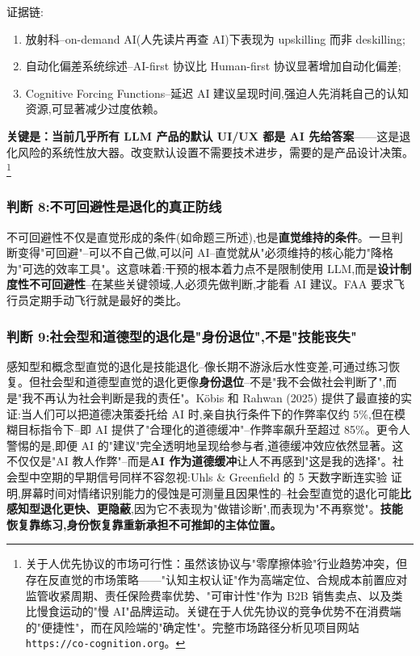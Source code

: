 \documentclass[11pt,a4paper]{article}
\begin{document}
证据链:
\begin{enumerate}[label=(\alph*)]
  \item 放射科--on-demand AI(人先读片再查 AI)下表现为 upskilling 而非 deskilling\cite{oncology2024};
  \item 自动化偏差系统综述--AI-first 协议比 Human-first 协议显著增加自动化偏差\cite{automationbias};
  \item Cognitive Forcing Functions--延迟 AI 建议呈现时间,强迫人先消耗自己的认知资源,可显著减少过度依赖\cite{bucinca2021cognitive}。
\end{enumerate}

\textbf{关键是：当前几乎所有 LLM 产品的默认 UI/UX 都是 AI 先给答案}——这是退化风险的系统性放大器。改变默认设置不需要技术进步，需要的是产品设计决策。\footnote{关于人优先协议的市场可行性：虽然该协议与"零摩擦体验"行业趋势冲突，但存在反直觉的市场策略——"认知主权认证"作为高端定位、合规成本前置应对监管收紧周期、责任保险费率优势、"可审计性"作为 B2B 销售卖点、以及类比慢食运动的"慢 AI"品牌运动。关键在于人优先协议的竞争优势不在消费端的"便捷性"，而在风险端的"确定性"。完整市场路径分析见项目网站 \texttt{https://co-cognition.org}。}

\subsubsection{判断 8:不可回避性是退化的真正防线}

不可回避性不仅是直觉形成的条件(如命题三所述),也是\textbf{直觉维持的条件}。一旦判断变得"可回避"--可以不自己做,可以问 AI--直觉就从"必须维持的核心能力"降格为"可选的效率工具"。这意味着:干预的根本着力点不是限制使用 LLM,而是\textbf{设计制度性不可回避性}--在某些关键领域,人必须先做判断,才能看 AI 建议。FAA 要求飞行员定期手动飞行就是最好的类比。

\subsubsection{判断 9:社会型和道德型的退化是"身份退位",不是"技能丧失"}

感知型和概念型直觉的退化是技能退化--像长期不游泳后水性变差,可通过练习恢复。但社会型和道德型直觉的退化更像\textbf{身份退位}--不是"我不会做社会判断了",而是"我不再认为社会判断是我的责任"。Köbis 和 Rahwan (2025)\cite{kobis2025moral} 提供了最直接的实证:当人们可以把道德决策委托给 AI 时,亲自执行条件下的作弊率仅约 5\%,但在模糊目标指令下--即 AI 提供了"合理化的道德缓冲"--作弊率飙升至超过 85\%。更令人警惕的是,即便 AI 的"建议"完全透明地呈现给参与者,道德缓冲效应依然显著。这不仅仅是"AI 教人作弊"--而是\textbf{AI 作为道德缓冲}让人不再感到"这是我的选择"。社会型中空期的早期信号同样不容忽视:Uhls \& Greenfield 的 5 天数字断连实验\cite{uhls2014five} 证明,屏幕时间对情绪识别能力的侵蚀是可测量且因果性的--社会型直觉的退化可能\textbf{比感知型退化更快、更隐蔽},因为它不表现为"做错诊断",而表现为"不再察觉"。\textbf{技能恢复靠练习,身份恢复靠重新承担不可推卸的主体位置。}
\end{document}
